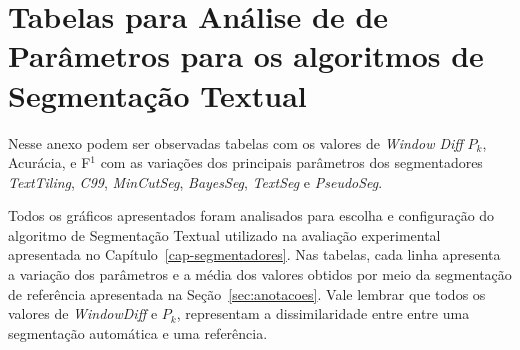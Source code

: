 \chapter{ Tabelas para Análise de de Parâmetros para os algoritmos de Segmentação Textual }\label{apendice1}


Nesse anexo podem ser observadas tabelas com os valores de \textit{Window Diff} $P_k$, Acurácia, e F$^1$ com as variações dos principais parâmetros dos segmentadores \textit{TextTiling}, \textit{C99}, \textit{MinCutSeg}, \textit{BayesSeg}, \textit{TextSeg} e \textit{PseudoSeg}.

Todos os gráficos apresentados foram analisados para escolha e configuração do algoritmo de Segmentação Textual utilizado na avaliação experimental apresentada no Capítulo~\ref{cap-segmentadores}. 
Nas tabelas, cada linha apresenta a variação dos parâmetros e a média dos valores obtidos por meio da segmentação de referência apresentada na Seção~\ref{sec:anotacoes}. Vale lembrar que todos os valores de \textit{WindowDiff} e $P_k$, representam a dissimilaridade entre entre uma segmentação automática e uma referência. 

\begin{landscape}%


\newpage

\end{landscape}
